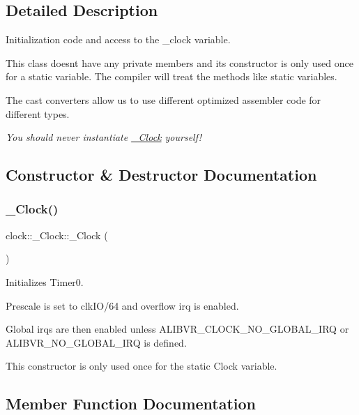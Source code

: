 \subsection{Detailed Description}
Initialization code and access to the \+\_\+clock variable. 

This class doesn\textquotesingle{}t have any private members and its constructor is only used once for a static variable. The compiler will treat the methods like static variables.

The cast converters allow us to use different optimized assembler code for different types.

{\itshape You should never instantiate \hyperlink{classclock_1_1__Clock}{\+\_\+\+Clock} yourself!} 

\subsection{Constructor \& Destructor Documentation}
\hypertarget{classclock_1_1__Clock_a6b87c9f7ce1d1b0de9a5e728a62342ce}{}\label{classclock_1_1__Clock_a6b87c9f7ce1d1b0de9a5e728a62342ce} 
\subsubsection{\texorpdfstring{\+\_\+\+Clock()}{\_Clock()}}
{\footnotesize\ttfamily clock\+::\+\_\+\+Clock\+::\+\_\+\+Clock (\begin{DoxyParamCaption}{ }\end{DoxyParamCaption})\hspace{0.3cm}{\ttfamily [inline]}}



Initializes {\ttfamily Timer0}. 

Prescale is set to clk\+I\+O/64 and overflow irq is enabled.

Global irqs are then enabled unless {\ttfamily A\+L\+I\+B\+V\+R\+\_\+\+C\+L\+O\+C\+K\+\_\+\+N\+O\+\_\+\+G\+L\+O\+B\+A\+L\+\_\+\+I\+RQ} or {\ttfamily A\+L\+I\+B\+V\+R\+\_\+\+N\+O\+\_\+\+G\+L\+O\+B\+A\+L\+\_\+\+I\+RQ} is defined.

This constructor is only used once for the static {\ttfamily Clock} variable. 

\subsection{Member Function Documentation}
\hypertarget{classclock_1_1__Clock_adaacf5c86adc29d0e0758197d1727d2e}{}\label{classclock_1_1__Clock_adaacf5c86adc29d0e0758197d1727d2e} 
